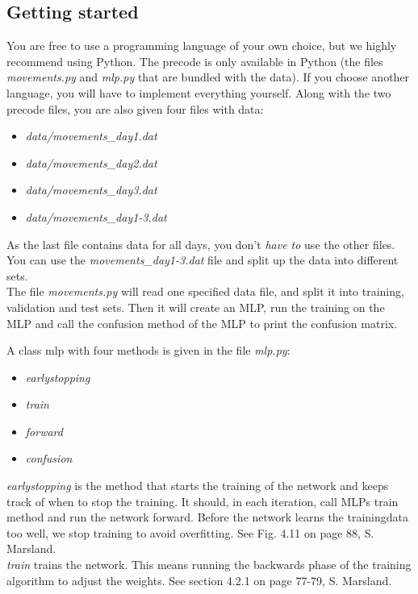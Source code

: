 \documentclass{article}           %
\begin{document}
\subsection*{Getting started}

You are free to use a programming language of your own choice, but we highly recommend using Python. The precode is only available in Python (the files \emph{movements.py} and \emph{mlp.py} that are bundled with the data). If you choose another language, you will have to implement everything yourself. Along with the two precode files, you are also given four files with data:
\begin{itemize}
\item \emph{data/movements\_day1.dat}
\item \emph{data/movements\_day2.dat}
\item \emph{data/movements\_day3.dat}
\item \emph{data/movements\_day1-3.dat}
\end{itemize}
As the last file contains data for all days, you don't \emph{have to} use the other files.
You can use the \emph{movements\_day1-3.dat} file and split up the data into different sets.\\


The file \emph{movements.py} will read one specified data file, and split it into training, validation and test sets. Then it will create an MLP, run the training on the MLP and call the confusion method of the MLP to print the confusion matrix.

\noindent A class mlp with four methods is given in the file \emph{mlp.py}:

\begin{itemize}
\item \emph{earlystopping}
\item \emph{train}
\item \emph{forward}
\item \emph{confusion}
\end{itemize}

\noindent \emph{earlystopping} is the method that starts the training of the network and keeps track of when to stop the training. It should, in each iteration, call MLPs train method and run the network forward. Before the network learns the trainingdata too well, we stop training to avoid overfitting. See Fig. 4.11 on page 88, S. Marsland.\\

\noindent \emph{train} trains the network. This means running the backwards phase of the training algorithm to adjust the weights. See section 4.2.1 on page 77-79, S. Marsland.\\
\end{document}
